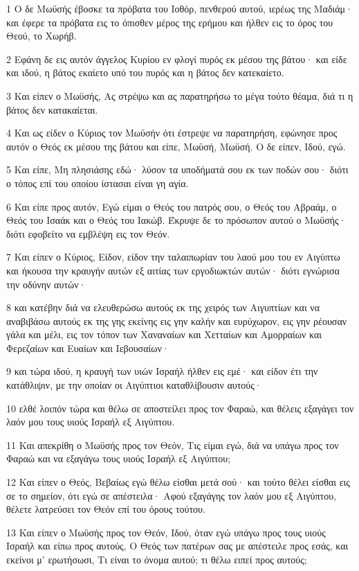 \par 1 Ο δε Μωϋσής έβοσκε τα πρόβατα του Ιοθόρ, πενθερού αυτού, ιερέως της Μαδιάμ· και έφερε τα πρόβατα εις το όπισθεν μέρος της ερήμου και ήλθεν εις το όρος του Θεού, το Χωρήβ.
\par 2 Εφάνη δε εις αυτόν άγγελος Κυρίου εν φλογί πυρός εκ μέσου της βάτου· και είδε και ιδού, η βάτος εκαίετο υπό του πυρός και η βάτος δεν κατεκαίετο.
\par 3 Και είπεν ο Μωϋσής, Ας στρέψω και ας παρατηρήσω το μέγα τούτο θέαμα, διά τι η βάτος δεν κατακαίεται.
\par 4 Και ως είδεν ο Κύριος τον Μωϋσήν ότι έστρεψε να παρατηρήση, εφώνησε προς αυτόν ο Θεός εκ μέσου της βάτου και είπε, Μωϋσή, Μωϋσή. Ο δε είπεν, Ιδού, εγώ.
\par 5 Και είπε, Μη πλησιάσης εδώ· λύσον τα υποδήματά σου εκ των ποδών σου· διότι ο τόπος επί του οποίου ίστασαι είναι γη αγία.
\par 6 Και είπε προς αυτόν, Εγώ είμαι ο Θεός του πατρός σου, ο Θεός του Αβραάμ, ο Θεός του Ισαάκ και ο Θεός του Ιακώβ. Έκρυψε δε το πρόσωπον αυτού ο Μωϋσής· διότι εφοβείτο να εμβλέψη εις τον Θεόν.
\par 7 Και είπεν ο Κύριος, Είδον, είδον την ταλαιπωρίαν του λαού μου του εν Αιγύπτω και ήκουσα την κραυγήν αυτών εξ αιτίας των εργοδιωκτών αυτών· διότι εγνώρισα την οδύνην αυτών·
\par 8 και κατέβην διά να ελευθερώσω αυτούς εκ της χειρός των Αιγυπτίων και να αναβιβάσω αυτούς εκ της γης εκείνης εις γην καλήν και ευρύχωρον, εις γην ρέουσαν γάλα και μέλι, εις τον τόπον των Χαναναίων και Χετταίων και Αμορραίων και Φερεζαίων και Ευαίων και Ιεβουσαίων·
\par 9 και τώρα ιδού, η κραυγή των υιών Ισραήλ ήλθεν εις εμέ· και είδον έτι την κατάθλιψιν, με την οποίαν οι Αιγύπτιοι καταθλίβουσιν αυτούς·
\par 10 ελθέ λοιπόν τώρα και θέλω σε αποστείλει προς τον Φαραώ, και θέλεις εξαγάγει τον λαόν μου τους υιούς Ισραήλ εξ Αιγύπτου.
\par 11 Και απεκρίθη ο Μωϋσής προς τον Θεόν, Τις είμαι εγώ, διά να υπάγω προς τον Φαραώ και να εξαγάγω τους υιούς Ισραήλ εξ Αιγύπτου;
\par 12 Και είπεν ο Θεός, Βεβαίως εγώ θέλω είσθαι μετά σού· και τούτο θέλει είσθαι εις σε το σημείον, ότι εγώ σε απέστειλα· Αφού εξαγάγης τον λαόν μου εξ Αιγύπτου, θέλετε λατρεύσει τον Θεόν επί του όρους τούτου.
\par 13 Και είπεν ο Μωϋσής προς τον Θεόν, Ιδού, όταν εγώ υπάγω προς τους υιούς Ισραήλ και είπω προς αυτούς, Ο Θεός των πατέρων σας με απέστειλε προς εσάς, και εκείνοι μ' ερωτήσωσι, Τι είναι το όνομα αυτού; τι θέλω ειπεί προς αυτούς;
